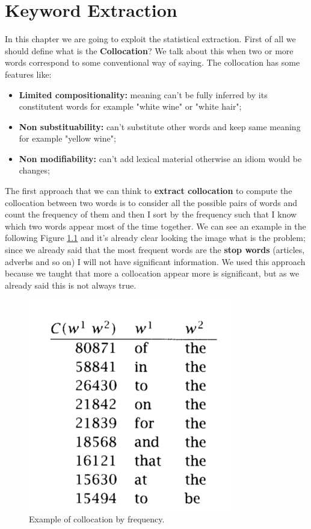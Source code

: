 \chapter{Keyword Extraction}
In this chapter we are going to exploit the statistical extraction. First of all we should define what is the \textbf{Collocation}? We talk about this when two or more words correspond to some conventional way of saying.\newline
The collocation has some features like:
\begin{itemize}
    \item \textbf{Limited compositionality:} meaning can't be fully inferred by its constitutent words for example "white wine" or "white hair";
    \item \textbf{Non substituability:} can't substitute other words and keep same meaning for example "yellow wine";
    \item \textbf{Non modifiability:} can't add lexical material otherwise an idiom would be changes;
\end{itemize}
The first approach that we can think to \textbf{extract collocation} to compute the collocation between two words is to consider all the possible pairs of words and count the frequency of them and then I sort by the frequency such that I know which two words appear most of the time together. We can see an example in the following Figure \ref{fig:collocationfrequencyex} and it's already clear looking the image what is the problem; since we already said that the most frequent words are the \textbf{stop words} (articles, adverbs and so on) I will not have significant information. We used this approach because we taught that more a collocation appear more is significant, but as we already said this is not always true.\newline
\begin{figure}
    \centering
    \includegraphics[width=0.75\linewidth]{images/collocationfrequencyex.png}
    \caption{Example of collocation by frequency.}
    \label{fig:collocationfrequencyex}
\end{figure}
